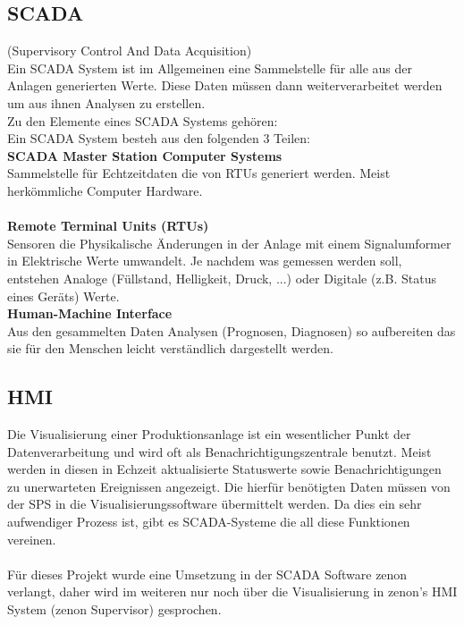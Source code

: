\subsection{SCADA}
(Supervisory Control And Data Acquisition)\\
Ein SCADA System ist im Allgemeinen eine Sammelstelle für alle aus der Anlagen generierten Werte. Diese Daten müssen dann weiterverarbeitet werden um aus ihnen Analysen zu erstellen.\\
Zu den Elemente eines SCADA Systems gehören:\\
Ein SCADA System besteh aus den folgenden 3 Teilen:
\\
\textbf{SCADA Master Station Computer Systems}\\
Sammelstelle für Echtzeitdaten die von RTUs generiert werden. Meist herkömmliche Computer Hardware.\\
\\
\textbf{Remote Terminal Units (RTUs)}\\
Sensoren die Physikalische Änderungen in der Anlage mit einem Signalumformer in Elektrische Werte umwandelt. Je nachdem was gemessen werden soll, entstehen Analoge (Füllstand, Helligkeit, Druck, ...) oder Digitale (z.B. Status eines Geräts) Werte.
\\
\textbf{Human-Machine Interface}\\
Aus den gesammelten Daten Analysen (Prognosen, Diagnosen) so aufbereiten das sie für den Menschen leicht verständlich dargestellt werden.\\

\subsection{HMI}
Die Visualisierung einer Produktionsanlage ist ein wesentlicher Punkt der Datenverarbeitung und wird oft als Benachrichtigungszentrale benutzt. Meist werden in diesen in Echzeit aktualisierte Statuswerte sowie Benachrichtigungen zu unerwarteten Ereignissen angezeigt. Die hierfür benötigten Daten müssen von der SPS in die Visualisierungssoftware übermittelt werden. Da dies ein sehr aufwendiger Prozess ist, gibt es SCADA-Systeme die all diese Funktionen vereinen.\\
\\
Für dieses Projekt wurde eine Umsetzung in der SCADA Software zenon verlangt, daher wird im weiteren nur noch über die Visualisierung in zenon's HMI System (zenon Supervisor) gesprochen.\\
\\

